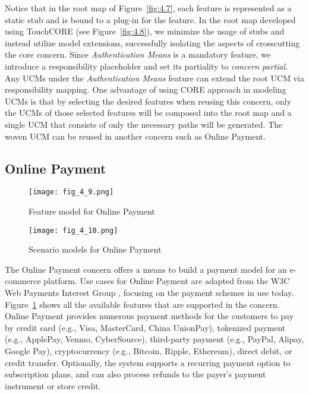 Notice that in the root map of Figure~\ref{fig:4.7}, each feature is represented as a static stub and is bound to a plug-in for the feature. In the root map developed using TouchCORE (see Figure~\ref{fig:4.8}), we minimize the usage of stubs and instead utilize model extensions, successfully isolating the aspects of crosscutting the core concern. Since \emph{Authentication Means} is a mandatory feature, we introduce a responsibility placeholder and set its partiality to \emph{concern partial}. Any UCMs under the \emph{Authentication Means} feature can extend the root UCM via responsibility mapping. One advantage of using CORE approach in modeling UCMs is that by selecting the desired features when reusing this concern, only the UCMs of those selected features will be composed into the root map and a single UCM that consists of only the necessary paths will be generated. The woven UCM can be reused in another concern such as Online Payment.

\subsection{Online Payment}

\begin{figure}[h]
	\centering
	\texttt{[image: fig\_4\_9.png]}
	\caption{Feature model for Online Payment}
	\label{fig:4.9}
\end{figure}

\begin{figure}
	\centering
	\texttt{[image: fig\_4\_10.png]}
	\caption{Scenario models for Online Payment}
	\label{fig:4.10}
\end{figure}

The Online Payment concern offers a means to build a payment model for an e-commerce platform. Use cases for Online Payment are adapted from the W3C Web Payments Interest Group \cite{w3c2015web}, focusing on the payment schemes in use today. Figure~\ref{fig:4.9} shows all the available features that are supported in the concern. Online Payment provides numerous payment methods for the customers to pay by credit card (e.g., Visa, MasterCard, China UnionPay), tokenized payment (e.g., ApplePay, Venmo, CyberSource), third-party payment (e.g., PayPal, Alipay, Google Pay), cryptocurrency (e.g., Bitcoin, Ripple, Ethereum), direct debit, or credit transfer. Optionally, the system supports a recurring payment option to  subscription plans, and can also process refunds to the payer's payment instrument or store credit.

